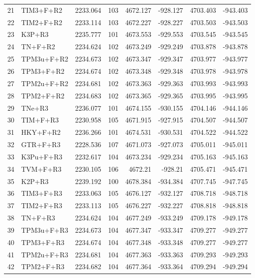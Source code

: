 \documentclass[12pt]{article}
\begin{document}
\begin{longtable}{clrrrrrr}
	21 & TIM3+F+R2 & 2233.064 & 103 & 4672.127 & -928.127 & 4703.403 & -943.403 \\ 
	22 & TIM2+F+R2 & 2233.114 & 103 & 4672.227 & -928.227 & 4703.503 & -943.503 \\ 
	23 & K3P+R3 & 2235.777 & 101 & 4673.553 & -929.553 & 4703.545 & -943.545 \\ 
	24 & TN+F+R2 & 2234.624 & 102 & 4673.249 & -929.249 & 4703.878 & -943.878 \\ 
	25 & TPM3u+F+R2 & 2234.673 & 102 & 4673.347 & -929.347 & 4703.977 & -943.977 \\ 
	26 & TPM3+F+R2 & 2234.674 & 102 & 4673.348 & -929.348 & 4703.978 & -943.978 \\ 
	27 & TPM2u+F+R2 & 2234.681 & 102 & 4673.363 & -929.363 & 4703.993 & -943.993 \\ 
	28 & TPM2+F+R2 & 2234.683 & 102 & 4673.365 & -929.365 & 4703.995 & -943.995 \\ 
	29 & TNe+R3 & 2236.077 & 101 & 4674.155 & -930.155 & 4704.146 & -944.146 \\ 
	30 & TIM+F+R3 & 2230.958 & 105 & 4671.915 & -927.915 & 4704.507 & -944.507 \\ 
	31 & HKY+F+R2 & 2236.266 & 101 & 4674.531 & -930.531 & 4704.522 & -944.522 \\ 
	32 & GTR+F+R3 & 2228.536 & 107 & 4671.073 & -927.073 & 4705.011 & -945.011 \\ 
	33 & K3Pu+F+R3 & 2232.617 & 104 & 4673.234 & -929.234 & 4705.163 & -945.163 \\ 
	34 & TVM+F+R3 & 2230.105 & 106 & 4672.21 & -928.21 & 4705.471 & -945.471 \\ 
	35 & K2P+R3 & 2239.192 & 100 & 4678.384 & -934.384 & 4707.745 & -947.745 \\ 
	36 & TIM3+F+R3 & 2233.063 & 105 & 4676.127 & -932.127 & 4708.718 & -948.718 \\ 
	37 & TIM2+F+R3 & 2233.113 & 105 & 4676.227 & -932.227 & 4708.818 & -948.818 \\ 
	38 & TN+F+R3 & 2234.624 & 104 & 4677.249 & -933.249 & 4709.178 & -949.178 \\ 
	39 & TPM3u+F+R3 & 2234.673 & 104 & 4677.347 & -933.347 & 4709.277 & -949.277 \\ 
	40 & TPM3+F+R3 & 2234.674 & 104 & 4677.348 & -933.348 & 4709.277 & -949.277 \\ 
	41 & TPM2u+F+R3 & 2234.681 & 104 & 4677.363 & -933.363 & 4709.293 & -949.293 \\ 
	42 & TPM2+F+R3 & 2234.682 & 104 & 4677.364 & -933.364 & 4709.294 & -949.294 \\ 

\end{longtable}
\end{document}
